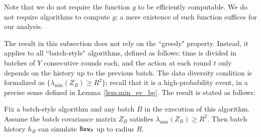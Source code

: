 Note that we do not require the function $g$ to be efficiently computable. We do not require algorithms to compute $g$; a mere existence of such function suffices for our analysis.

The result in this subsection does not rely on the ``greedy" property. Instead, it applies to all ``batch-style" algorithms, defined as follows: time is divided in batches of $Y$ consecutive rounds each, and the action at each round $t$ only depends on the history up to the previous batch. The data diversity condition is formalized as $\{\lambda_{\min}(Z_B) \ge R^2 \}$; recall that it is a high-probability event, in a precise sense defined in Lemma~\ref{lem:min_ev_bg}. The result is stated as follows:

\begin{lemma}
Fix a batch-style algorithm and any batch $B$ in the execution of this algorithm.
Assume the batch covariance matrix $Z_B$ satisfies $\lambda_{\min}(Z_B) \ge R^2$. Then batch history $h_B$ can simulate $\mathtt{Rew}_{\theta}$ up to radius $R$.
  \label{lem:lin_sim}
\end{lemma}


